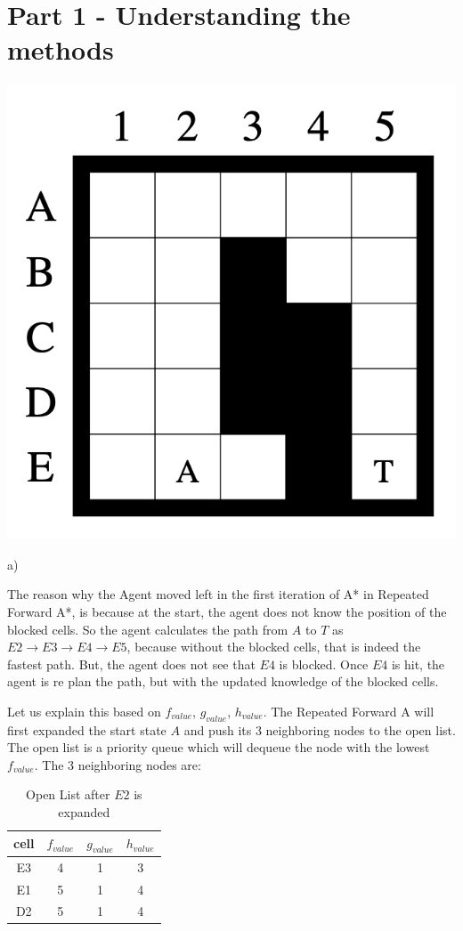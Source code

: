 \documentclass[10pt]{article}
\begin{document}
\section*{Part 1 - Understanding the methods}
\begin{center}
\includegraphics[scale=0.5]{images/E2B94D34-1A9A-49F5-AC00-7BD7A4C3DDC3.png}

\end{center}
a)

The reason why the Agent moved left in the first iteration of A* in Repeated Forward A*, is because at the start, the agent does not know the position of the blocked cells. So the agent calculates the path from $A$ to $T$ as $E2\xrightarrow{}E3\xrightarrow{}E4\xrightarrow{}E5$, because without the blocked cells, that is indeed the fastest path. But, the agent does not see that $E4$ is blocked. Once $E4$ is hit, the agent is re plan the path, but with the updated knowledge of the blocked cells. 

Let us explain this based on $f_{value}$, $g_{value}$, $h_{value}$. The Repeated Forward A will first expanded the start state $A$ and push its 3 neighboring nodes to the open list. The open list is a priority queue which will dequeue the node with the lowest $f_{value}$. 
The 3 neighboring nodes are:
\begin{table}[h!]
\centering
\begin{tabular}{||c c c c ||} 
 \hline
 cell & $f_{value}$ & $g_{value}$ & $h_{value}$ \\ [0.5ex] 
 \hline\hline
E3 & 4 &  1 & 3 \\ 
E1 & 5 & 1 & 4\\ 
D2 & 5 & 1 & 4 \\  
 \hline
\end{tabular}
\caption{ Open List after $E2$ is expanded}
\label{table:0}
\end{table}
\end{document}

